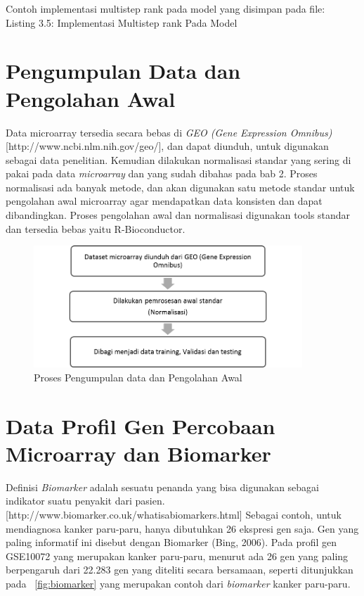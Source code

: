 Contoh implementasi multistep rank pada model yang disimpan pada file: \\
Listing 3.5: Implementasi Multistep rank Pada Model


\section{Pengumpulan Data dan Pengolahan Awal}
Data microarray tersedia secara bebas di \textit{GEO (Gene Expression Omnibus)} [http://www.ncbi.nlm.nih.gov/geo/], dan dapat diunduh, untuk digunakan sebagai data penelitian. Kemudian dilakukan normalisasi standar yang sering di pakai pada data \textit{microarray} dan yang sudah dibahas pada bab 2. Proses normalisasi ada banyak metode, dan akan digunakan satu metode standar untuk pengolahan awal microarray agar mendapatkan data konsisten dan dapat dibandingkan. Proses pengolahan awal dan normalisasi digunakan tools standar dan tersedia bebas yaitu R-Bioconductor. \\

\begin{figure}
	\centering
	\includegraphics[width=0.9\textwidth]
		{pics/bagian1.png}
	\caption{Proses Pengumpulan data dan Pengolahan Awal}
	\label{fig:pengolahan_awal}
\end{figure}


\section{Data Profil Gen Percobaan Microarray dan Biomarker}

Definisi \textit{Biomarker} adalah sesuatu penanda yang bisa digunakan sebagai indikator suatu penyakit dari pasien. [http://www.biomarker.co.uk/whatisabiomarkers.html] Sebagai contoh, untuk mendiagnosa kanker paru-paru, hanya dibutuhkan 26 ekspresi gen saja. Gen yang paling informatif ini disebut dengan Biomarker (Bing, 2006). Pada profil gen GSE10072 yang merupakan kanker paru-paru, menurut  \citep{belinsky2004gene} ada 26 gen yang paling berpengaruh dari 22.283 gen yang diteliti secara bersamaan, seperti ditunjukkan pada \pic~\ref{fig:biomarker} yang merupakan contoh dari \textit{biomarker} kanker paru-paru.

